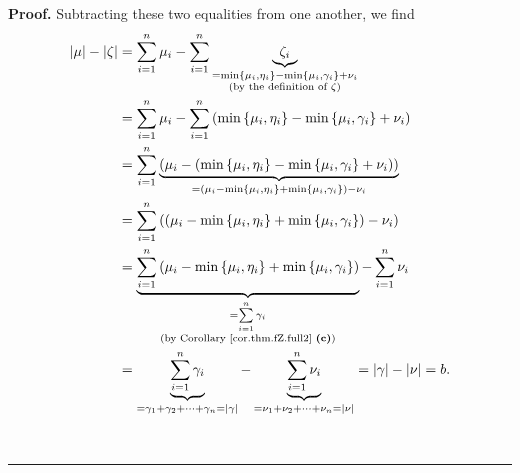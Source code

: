 \documentclass[numbers=enddot,12pt,final,onecolumn,notitlepage]{scrartcl}%
\theoremstyle{definition}
\newenvironment{proof}[1][Proof]{\noindent\textbf{#1.} }{\ \rule{0.5em}{0.5em}}
\let\sumnonlimits\sum
\renewcommand{\sum}{\sumnonlimits\limits}
\newenvironment{vershort}{}{}
\begin{document}
\begin{proof}
\begin{vershort}
\noindent Subtracting these two equalities from one another, we find%
\begin{align*}
\left\vert \mu\right\vert -\left\vert \zeta\right\vert  &  =\sum_{i=1}^{n}%
\mu_{i}-\sum_{i=1}^{n}\underbrace{\zeta_{i}}_{\substack{=\min\left\{  \mu
_{i},\eta_{i}\right\}  -\min\left\{  \mu_{i},\gamma_{i}\right\}  +\nu
_{i}\\\text{(by the definition of }\zeta\text{)}}}\\
&  =\sum_{i=1}^{n}\mu_{i}-\sum_{i=1}^{n}\left(  \min\left\{  \mu_{i},\eta
_{i}\right\}  -\min\left\{  \mu_{i},\gamma_{i}\right\}  +\nu_{i}\right) \\
&  =\sum_{i=1}^{n}\underbrace{\left(  \mu_{i}-\left(  \min\left\{  \mu
_{i},\eta_{i}\right\}  -\min\left\{  \mu_{i},\gamma_{i}\right\}  +\nu
_{i}\right)  \right)  }_{=\left(  \mu_{i}-\min\left\{  \mu_{i},\eta
_{i}\right\}  +\min\left\{  \mu_{i},\gamma_{i}\right\}  \right)  -\nu_{i}}\\
&  =\sum_{i=1}^{n}\left(  \left(  \mu_{i}-\min\left\{  \mu_{i},\eta
_{i}\right\}  +\min\left\{  \mu_{i},\gamma_{i}\right\}  \right)  -\nu
_{i}\right) \\
&  =\underbrace{\sum_{i=1}^{n}\left(  \mu_{i}-\min\left\{  \mu_{i},\eta
_{i}\right\}  +\min\left\{  \mu_{i},\gamma_{i}\right\}  \right)
}_{\substack{=\sum_{i=1}^{n}\gamma_{i}\\\text{(by Corollary
\ref{cor.thm.fZ.full2} \textbf{(c)})}}}-\sum_{i=1}^{n}\nu_{i}\\
&  =\underbrace{\sum_{i=1}^{n}\gamma_{i}}_{=\gamma_{1}+\gamma_{2}%
+\cdots+\gamma_{n}=\left\vert \gamma\right\vert }-\underbrace{\sum_{i=1}%
^{n}\nu_{i}}_{=\nu_{1}+\nu_{2}+\cdots+\nu_{n}=\left\vert \nu\right\vert
}=\left\vert \gamma\right\vert -\left\vert \nu\right\vert =b.
\end{align*}

\end{vershort}


\end{proof}
\end{document}
